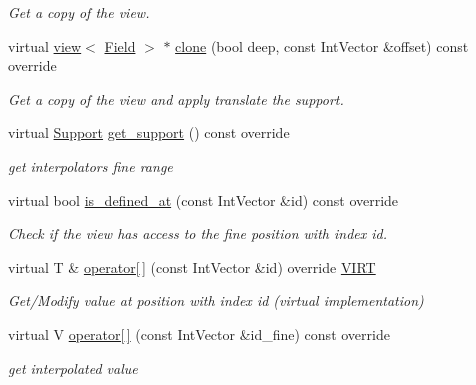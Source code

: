 \begin{DoxyCompactItemize}
\begin{DoxyCompactList}\small\item\em Get a copy of the view. \end{DoxyCompactList}\item 
virtual \hyperlink{classUintah_1_1PhaseField_1_1detail_1_1view}{view}$<$ \hyperlink{structUintah_1_1PhaseField_1_1ScalarField}{Field} $>$ $\ast$ \hyperlink{classUintah_1_1PhaseField_1_1detail_1_1amr__interpolator_3_01ScalarField_3_01T_01_4_00_01Problemdf68628a6010a1e1526666730125c372_ac7391fa05270a0b845674752ce8bb8bf}{clone} (bool deep, const Int\+Vector \&offset) const override
\begin{DoxyCompactList}\small\item\em Get a copy of the view and apply translate the support. \end{DoxyCompactList}\item 
virtual \hyperlink{classUintah_1_1PhaseField_1_1Support}{Support} \hyperlink{classUintah_1_1PhaseField_1_1detail_1_1amr__interpolator_3_01ScalarField_3_01T_01_4_00_01Problemdf68628a6010a1e1526666730125c372_ac5fa7533900896ba125401671a5739d2}{get\+\_\+support} () const override
\begin{DoxyCompactList}\small\item\em get interpolator\textquotesingle{}s fine range \end{DoxyCompactList}\item 
virtual bool \hyperlink{classUintah_1_1PhaseField_1_1detail_1_1amr__interpolator_3_01ScalarField_3_01T_01_4_00_01Problemdf68628a6010a1e1526666730125c372_a5fa0ce1cd64383bfba2965f9cb88d35b}{is\+\_\+defined\+\_\+at} (const Int\+Vector \&id) const override
\begin{DoxyCompactList}\small\item\em Check if the view has access to the fine position with index id. \end{DoxyCompactList}\item 
virtual T \& \hyperlink{classUintah_1_1PhaseField_1_1detail_1_1amr__interpolator_3_01ScalarField_3_01T_01_4_00_01Problemdf68628a6010a1e1526666730125c372_a11af7680ab9786aade9b1913cd846c6f}{operator\mbox{[}$\,$\mbox{]}} (const Int\+Vector \&id) override \hyperlink{Definitions_8h_a3ce9c14452594b5b9ee3b63f9b3a981e}{V\+I\+RT}
\begin{DoxyCompactList}\small\item\em Get/\+Modify value at position with index id (virtual implementation) \end{DoxyCompactList}\item 
virtual V \hyperlink{classUintah_1_1PhaseField_1_1detail_1_1amr__interpolator_3_01ScalarField_3_01T_01_4_00_01Problemdf68628a6010a1e1526666730125c372_ae35934d096a5301035afb6347114f465}{operator\mbox{[}$\,$\mbox{]}} (const Int\+Vector \&id\+\_\+fine) const override
\begin{DoxyCompactList}\small\item\em get interpolated value \end{DoxyCompactList}\end{DoxyCompactItemize}
